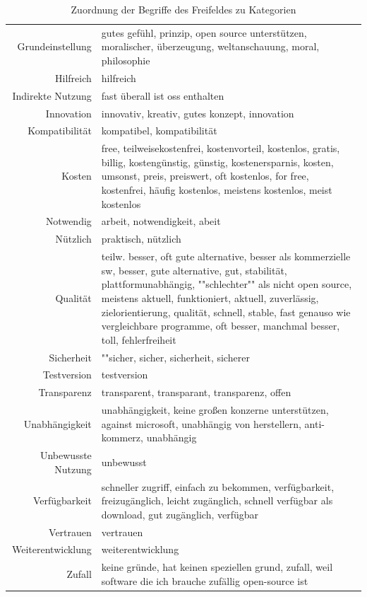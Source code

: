 \documentclass[a4paper]{article}
\begin{document}
\begin{table}[h]
\begin{tabularx}{\textwidth}{rX}
                    Grundeinstellung & \tiny gutes gefühl, prinzip, open source unterstützen, moralischer, überzeugung, weltanschauung, moral, philosophie\\
                    Hilfreich & \tiny hilfreich\\
                    Indirekte Nutzung & \tiny fast überall ist oss enthalten\\
                    Innovation & \tiny innovativ, kreativ, gutes konzept, innovation\\
                    Kompatibilität & \tiny kompatibel, kompatibilität\\
                    Kosten & \tiny free, teilweisekostenfrei, kostenvorteil, kostenlos, gratis, billig, kostengünstig, günstig, kostenersparnis, kosten, umsonst, preis, preiswert, oft kostenlos, for free, kostenfrei, häufig kostenlos, meistens kostenlos, meist kostenlos\\
                    Notwendig & \tiny arbeit, notwendigkeit, abeit\\
                    Nützlich & \tiny praktisch, nützlich\\
                    Qualität & \tiny teilw. besser, oft gute alternative, besser als kommerzielle sw, besser, gute alternative, gut, stabilität, plattformunabhängig, ""schlechter"" als nicht open source, meistens aktuell, funktioniert, aktuell, zuverlässig, zielorientierung, qualität, schnell, stable, fast genauso wie vergleichbare programme, oft besser, manchmal besser, toll, fehlerfreiheit\\
                    Sicherheit & \tiny ""sicher, sicher, sicherheit, sicherer\\
                    Testversion & \tiny testversion\\
                    Transparenz & \tiny transparent, transparant, transparenz, offen\\
                    Unabhängigkeit & \tiny unabhängigkeit, keine großen konzerne unterstützen, against microsoft, unabhängig von herstellern, anti-kommerz, unabhängig\\
                    Unbewusste Nutzung & \tiny unbewusst\\
                    Verfügbarkeit & \tiny schneller zugriff, einfach zu bekommen, verfügbarkeit, freizugänglich, leicht zugänglich, schnell verfügbar als download, gut zugänglich, verfügbar\\
                    Vertrauen & \tiny vertrauen\\
                    Weiterentwicklung & \tiny weiterentwicklung\\
                    Zufall & \tiny keine gründe, hat keinen speziellen grund, zufall, weil software die ich brauche zufällig open-source ist\\
                \end{tabularx}
                \caption{Zuordnung der Begriffe des Freifeldes zu Kategorien}
            \label{table:categories}
            \end{table}
\end{document}
